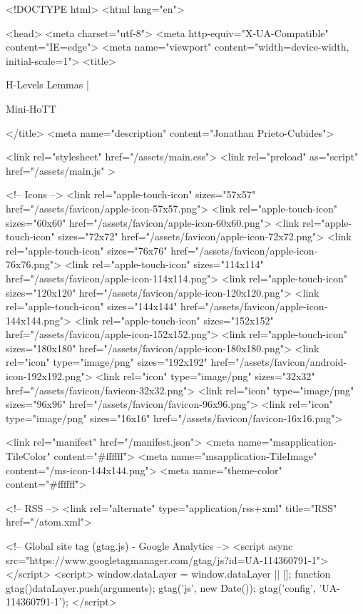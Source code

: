 <!DOCTYPE html>
<html lang="en">

<head>
  <meta charset="utf-8">
  <meta http-equiv="X-UA-Compatible" content="IE=edge">
  <meta name="viewport" content="width=device-width, initial-scale=1">
  <title>
    
      
        H-Levels Lemmas |
      
        Mini-HoTT
    
  </title>
  <meta name="description" content="Jonathan Prieto-Cubides">

  <link rel="stylesheet" href="/assets/main.css">
  <link rel="preload" as="script" href="/assets/main.js" >

  <!-- Icons -->
  <link rel="apple-touch-icon" sizes="57x57" href="/assets/favicon/apple-icon-57x57.png">
  <link rel="apple-touch-icon" sizes="60x60" href="/assets/favicon/apple-icon-60x60.png">
  <link rel="apple-touch-icon" sizes="72x72" href="/assets/favicon/apple-icon-72x72.png">
  <link rel="apple-touch-icon" sizes="76x76" href="/assets/favicon/apple-icon-76x76.png">
  <link rel="apple-touch-icon" sizes="114x114" href="/assets/favicon/apple-icon-114x114.png">
  <link rel="apple-touch-icon" sizes="120x120" href="/assets/favicon/apple-icon-120x120.png">
  <link rel="apple-touch-icon" sizes="144x144" href="/assets/favicon/apple-icon-144x144.png">
  <link rel="apple-touch-icon" sizes="152x152" href="/assets/favicon/apple-icon-152x152.png">
  <link rel="apple-touch-icon" sizes="180x180" href="/assets/favicon/apple-icon-180x180.png">
  <link rel="icon" type="image/png" sizes="192x192"  href="/assets/favicon/android-icon-192x192.png">
  <link rel="icon" type="image/png" sizes="32x32" href="/assets/favicon/favicon-32x32.png">
  <link rel="icon" type="image/png" sizes="96x96" href="/assets/favicon/favicon-96x96.png">
  <link rel="icon" type="image/png" sizes="16x16" href="/assets/favicon/favicon-16x16.png">

  <link rel="manifest" href="/manifest.json">
  <meta name="msapplication-TileColor" content="#ffffff">
  <meta name="msapplication-TileImage" content="/ms-icon-144x144.png">
  <meta name="theme-color" content="#ffffff">

  <!-- RSS -->
  <link rel="alternate" type="application/rss+xml" title="RSS" href="/atom.xml">

  <!-- Global site tag (gtag.js) - Google Analytics -->
  <script async src="https://www.googletagmanager.com/gtag/js?id=UA-114360791-1"></script>
  <script>
    window.dataLayer = window.dataLayer || [];
    function gtag(){dataLayer.push(arguments);}
    gtag('js', new Date());
    gtag('config', 'UA-114360791-1');
  </script>

